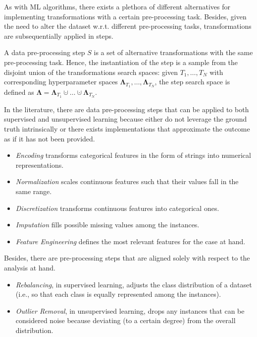 As with ML algorithms, there exists a plethora of different alternatives for implementing transformations with a certain pre-processing task.
Besides, given the need to alter the dataset w.r.t. different pre-processing tasks, transformations are subsequentially applied in steps.

\begin{definition}
    A data pre-processing step $S$ is a set of alternative transformations with the same pre-processing task.
    Hence, the instantiation of the step is a sample from the disjoint union of the transformations search spaces: given $T_1, \dots, T_N$ with corresponding hyperparameter spaces $\pmb{\Lambda}_{T_1}, \dots, \pmb{\Lambda}_{T_N}$, the step search space is defined as  $\pmb{\Lambda}  = \pmb{\Lambda}_{T_1} \cupdot \dots \cupdot \pmb{\Lambda}_{T_N}$.
\end{definition}

In the literature, there are data pre-processing steps that can be applied to both supervised and unsupervised learning because either do not leverage the ground truth intrinsically or there exists implementations that approximate the outcome as if it has not been provided.
\begin{itemize}
    \item \textit{Encoding} transforms categorical features in the form of strings into numerical representations.
    \item \textit{Normalization} scales continuous features such that their values fall in the same range.
    \item \textit{Discretization} transforms continuous features into categorical ones.
    \item \textit{Imputation} fills possible missing values among the instances.
    \item \textit{Feature Engineering} defines the most relevant features for the case at hand.
\end{itemize}

Besides, there are pre-processing steps that are aligned solely with respect to the analysis at hand.
\begin{itemize}
    \item \textit{Rebalancing}, in supervised learning, adjusts the class distribution of a dataset (i.e., so that each class is equally represented among the instances).
    \item \textit{Outlier Removal}, in unsupervised learning, drops any instances that can be considered noise because deviating (to a certain degree) from the overall distribution.
\end{itemize}

